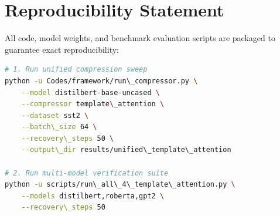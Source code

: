 \section{Reproducibility Statement}
All code, model weights, and benchmark evaluation scripts are packaged to guarantee exact reproducibility:
\begin{lstlisting}[language=bash]
# 1. Run unified compression sweep
python -u Codes/framework/run\_compressor.py \
    --model distilbert-base-uncased \
    --compressor template\_attention \
    --dataset sst2 \
    --batch\_size 64 \
    --recovery\_steps 50 \
    --output\_dir results/unified\_template\_attention

# 2. Run multi-model verification suite
python -u scripts/run\_all\_4\_template\_attention.py \
    --models distilbert,roberta,gpt2 \
    --recovery\_steps 50
\end{lstlisting}
